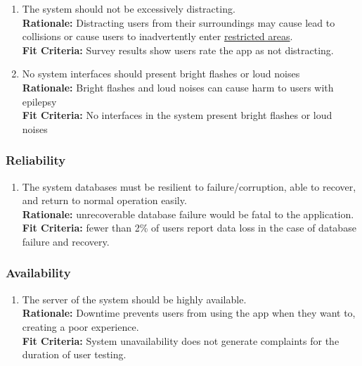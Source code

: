 \documentclass{article}
\begin{document}
\begin{enumerate}[align=left, label=\textbf{QS-SA\arabic*.}]
    \item The system should not be excessively distracting. \\
          {\bf Rationale:} Distracting users from their surroundings may cause lead to collisions or cause users to inadvertently enter \hyperref[def:restricted_area]{restricted areas}.\\
          {\bf Fit Criteria:} Survey results show users rate the app as not distracting.
    \item No system interfaces should present bright flashes or loud noises \\
          {\bf Rationale:} Bright flashes and loud noises can cause harm to users with epilepsy \\
          {\bf Fit Criteria:} No interfaces in the system present bright flashes or loud noises
\end{enumerate}

\subsubsection{Reliability}
\label{sub:reliability}

\begin{enumerate}[align=left, label=\textbf{QS-R\arabic*.}]
    \item The system databases must be resilient to failure/corruption, able to recover, and return to normal operation easily. \\
          {\bf Rationale:} unrecoverable database failure would be fatal to the application. \\
          {\bf Fit Criteria:} fewer than 2\% of users report data loss in the case of database failure and recovery.
\end{enumerate}


\subsubsection{Availability}
\label{sub:availability}

\begin{enumerate}[align=left, label=\textbf{QS-A\arabic*.}]

    \item The server of the system should be highly available. \\
          {\bf Rationale:} Downtime prevents users from using the app when they want to, creating a poor experience. \\
          {\bf Fit Criteria:} System unavailability does not generate complaints for the duration of user testing.
\end{enumerate}
\end{document}
